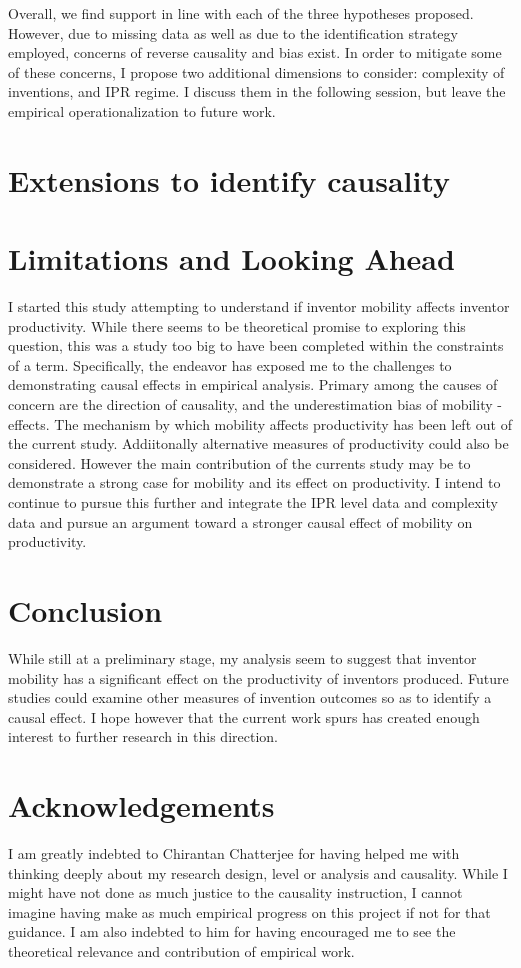 \documentclass[12pt]{article}
\begin{document}
Overall, we find support in line with each of the three hypotheses proposed. However, due to missing data as well as due to the identification strategy employed, concerns of reverse causality and bias exist. In order to mitigate some of these concerns, I propose two additional dimensions to consider: complexity of inventions, and IPR regime. I discuss them in the following session, but leave the empirical operationalization to future work.


\section{Extensions to identify causality}


\section{Limitations and Looking Ahead}
I started this study attempting to understand if inventor mobility affects inventor productivity. While there seems to be theoretical promise to exploring this question, this was a study too big to have been completed within the constraints of a term. Specifically, the endeavor has exposed me to the challenges to demonstrating causal effects in empirical analysis. Primary among the causes of concern are the direction of causality, and the underestimation bias of mobility - effects. The mechanism by which mobility affects productivity has been left out of the current study. Addiitonally alternative measures of productivity could also be considered. However the main contribution of the currents study may be to demonstrate a strong case for mobility and its effect on productivity.  I intend to continue to pursue this further and integrate the IPR level data and complexity data and pursue an argument toward a stronger causal effect of mobility on productivity.

\section{Conclusion}
While still at a preliminary stage, my analysis seem to suggest that inventor mobility  has a significant effect on the productivity of inventors produced. Future studies could  examine other measures of invention outcomes so as to identify a causal effect. I hope however that the current work spurs has created enough interest to further research in this direction.


\section*{Acknowledgements}
I am greatly indebted to Chirantan Chatterjee for having helped me with thinking deeply about my research design, level or analysis and causality. While I might have not done as much justice to the causality instruction, I cannot imagine having make as much empirical progress on this project if not for that guidance. I am also indebted to him for having encouraged me to see the theoretical relevance and contribution of empirical work.
\end{document}
